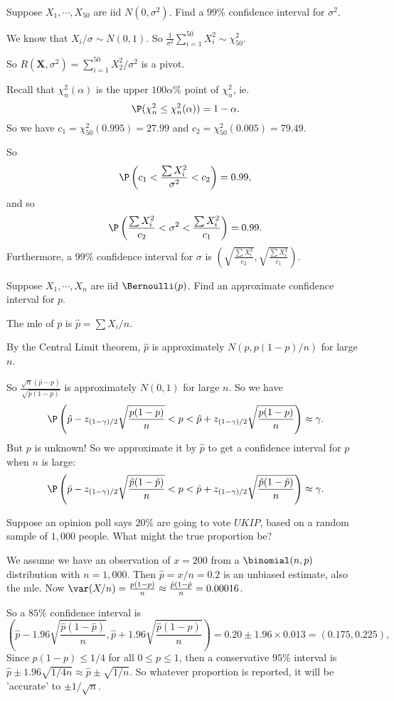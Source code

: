 \documentclass[a4paper]{article}
\begin{document}
\begin{eg}
  Suppose $X_1, \cdots, X_{50}$ are iid $N(0, \sigma^2)$. Find a $99\%$ confidence interval for $\sigma^2$.

  We know that $X_i/\sigma \sim N(0, 1)$. So $\displaystyle\frac{1}{\sigma^2}\sum_{i = 1}^{50}X_i^2 \sim \chi^2_{50}$.

  So $R(\mathbf{X}, \sigma^2) = \sum_{i = 1}^{50} X_2^2/\sigma^2$ is a pivot.

  Recall that $\chi_n^2(\alpha)$ is the upper $100\alpha\%$ point of $\chi_n^2$, ie.
  \[
    \P(\chi_n^2 \leq \chi_n^2(\alpha)) = 1 - \alpha.
  \]
  So we have $c_1 = \chi_{50}^2(0.995) = 27.99$ and $c_2 = \chi_{50}^2(0.005) = 79.49$.

  So
  \[
    \P \left(c_1 < \frac{\sum X_i^2}{\sigma^2} < c_2\right) = 0.99,
  \]
  and so
  \[
    \P\left(\frac{\sum X_i^2}{c_2} < \sigma^2 < \frac{\sum X_i^2}{c_1}\right) = 0.99.
  \]
  Furthermore, a $99\%$ confidence interval for $\sigma$ is $\left(\sqrt{\frac{\sum X_i^2}{c_2}}, \sqrt{\frac{\sum X_i^2}{c_1}}\right)$.
\end{eg}

\begin{eg}
  Suppose $X_1, \cdots, X_n$ are iid $\Bernoulli(p)$. Find an approximate confidence interval for $p$.

  The mle of $p$ is $\hat p = \sum X_i/n$.

  By the Central Limit theorem, $\hat{p}$ is approximately $N(p, p(1 - p)/n)$ for large $n$.

  So $\displaystyle \frac{\sqrt{n}(\hat{p} - p)}{\sqrt{p(1 - p)}}$ is approximately $N(0, 1)$ for large $n$. So we have
  \[
    \P\left(\hat p - z_{(1 - \gamma)/2}\sqrt{\frac{p(1 - p)}{n}} < p < \hat{p} + z_{(1 - \gamma)/2}\sqrt{\frac{p(1 - p)}{n}}\right)\approx \gamma.
  \]
  But $p$ is unknown! So we approximate it by $\hat{p}$ to get a confidence interval for $p$ when $n$ is large:
  \[
    \P\left(\hat p - z_{(1 - \gamma)/2}\sqrt{\frac{\hat p(1 - \hat p)}{n}} < p < \hat{p} + z_{(1 - \gamma)/2}\sqrt{\frac{\hat p(1 - \hat p)}{n}}\right)\approx \gamma.
  \]
\end{eg}

\begin{eg}
  Suppose an opinion poll says $20\%$ are going to vote $UKIP$, based on a random sample of $1,000$ people. What might the true proportion be?

  We assume we have an observation of $x = 200$ from a $\binomial(n, p)$ distribution with $n = 1,000$. Then $\hat p = x/n = 0.2$ is an unbiased estimate, also the mle.
  Now $\var(X/n) = \frac{p(1 - p)}{n}\approx \frac{\hat p(1 - \hat p}{n} = 0.00016$.

  So a $85\%$ confidence interval is
  \[
    \left(\hat p - 1.96\sqrt{\frac{\hat p(1 - \hat p)}{n}}, \hat p + 1.96\sqrt{\frac{\hat p(1 - \hat p)}{n}}\right) = 0.20 \pm 1.96\times 0.013 = (0.175, 0.225),
  \]
  \note Since $p(1 - p)\leq 1/4$ for all $0 \leq p \leq 1$, then a conservative $95\%$ interval is $\hat p \pm 1.96\sqrt{1/4n} \approx \hat p \pm \sqrt{1/n}$. So whatever proportion is reported, it will be 'accurate' to $\pm 1/\sqrt{n}$.
\end{eg}
\end{document}
